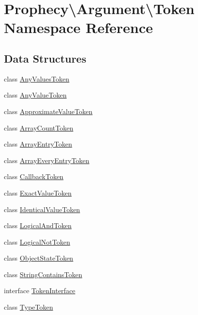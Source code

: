 \hypertarget{namespace_prophecy_1_1_argument_1_1_token}{}\section{Prophecy\textbackslash{}Argument\textbackslash{}Token Namespace Reference}
\label{namespace_prophecy_1_1_argument_1_1_token}
\subsection*{Data Structures}
\begin{DoxyCompactItemize}
\item 
class \mbox{\hyperlink{class_prophecy_1_1_argument_1_1_token_1_1_any_values_token}{Any\+Values\+Token}}
\item 
class \mbox{\hyperlink{class_prophecy_1_1_argument_1_1_token_1_1_any_value_token}{Any\+Value\+Token}}
\item 
class \mbox{\hyperlink{class_prophecy_1_1_argument_1_1_token_1_1_approximate_value_token}{Approximate\+Value\+Token}}
\item 
class \mbox{\hyperlink{class_prophecy_1_1_argument_1_1_token_1_1_array_count_token}{Array\+Count\+Token}}
\item 
class \mbox{\hyperlink{class_prophecy_1_1_argument_1_1_token_1_1_array_entry_token}{Array\+Entry\+Token}}
\item 
class \mbox{\hyperlink{class_prophecy_1_1_argument_1_1_token_1_1_array_every_entry_token}{Array\+Every\+Entry\+Token}}
\item 
class \mbox{\hyperlink{class_prophecy_1_1_argument_1_1_token_1_1_callback_token}{Callback\+Token}}
\item 
class \mbox{\hyperlink{class_prophecy_1_1_argument_1_1_token_1_1_exact_value_token}{Exact\+Value\+Token}}
\item 
class \mbox{\hyperlink{class_prophecy_1_1_argument_1_1_token_1_1_identical_value_token}{Identical\+Value\+Token}}
\item 
class \mbox{\hyperlink{class_prophecy_1_1_argument_1_1_token_1_1_logical_and_token}{Logical\+And\+Token}}
\item 
class \mbox{\hyperlink{class_prophecy_1_1_argument_1_1_token_1_1_logical_not_token}{Logical\+Not\+Token}}
\item 
class \mbox{\hyperlink{class_prophecy_1_1_argument_1_1_token_1_1_object_state_token}{Object\+State\+Token}}
\item 
class \mbox{\hyperlink{class_prophecy_1_1_argument_1_1_token_1_1_string_contains_token}{String\+Contains\+Token}}
\item 
interface \mbox{\hyperlink{interface_prophecy_1_1_argument_1_1_token_1_1_token_interface}{Token\+Interface}}
\item 
class \mbox{\hyperlink{class_prophecy_1_1_argument_1_1_token_1_1_type_token}{Type\+Token}}
\end{DoxyCompactItemize}
